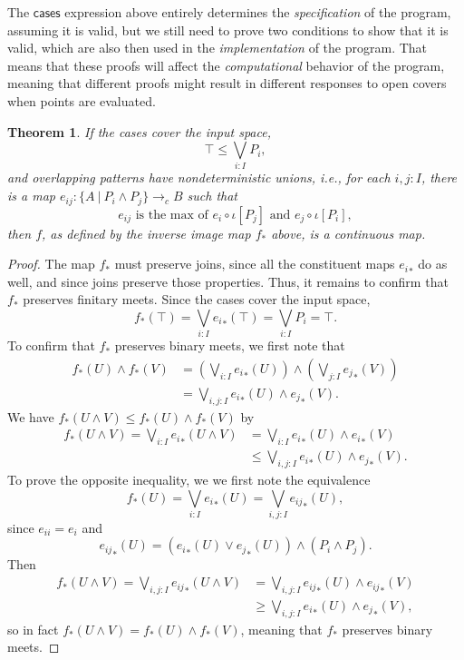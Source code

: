 \documentclass[conference]{IEEEtran}
\newtheorem{theorem}{Theorem}
\newcommand{\cto}{\to_c}
\newcommand{\suchthat}{\ |\ }
\newcommand{\oinclf}[1]{\iota[{#1}]}
\newcommand{\isthemaxof}[3]{{#1}\text{ is the max of }{#2}\text{ and }{#3}}
\begin{document}
The $\mathsf{cases}$ expression above entirely determines the \emph{specification} of the program, assuming it is valid, but we still need to prove two conditions to show that it is valid, which are also then used in the \emph{implementation} of the program. That means that these proofs will affect the \emph{computational} behavior of the program, meaning that different proofs might result in different responses to open covers when points are evaluated. 
\begin{theorem}
\label{pattern}
If the cases cover the input space,
\[
\top \le \bigvee_{i : I} P_i \tag{covering},
\]
and overlapping patterns have nondeterministic unions, i.e., for each $i, j : I$, there is a map $e_{ij} : \{A \suchthat P_i \wedge P_j \} \cto B$ such that
\[
\isthemaxof{ e_{ij} }{ e_i \circ \oinclf{P_j} }{ e_j \circ \oinclf{P_i} }, \tag{gluing}
\]
then $f$, as defined by the inverse image map $f_*$ above, is a continuous map.
\end{theorem}
\begin{proof}
The map $f_*$ must preserve joins, since all the constituent maps ${e_i}_*$ do as well, and since joins preserve those properties. Thus, it remains to confirm that $f_*$ preserves finitary meets.
Since the cases cover the input space,
\[
f_*(\top) = \bigvee_{i : I} {e_i}_*(\top) = \bigvee_{i : I}P_i = \top.
\]
To confirm that $f_*$ preserves binary meets, we first note that
\begin{align*}
f_*(U) \wedge f_*(V) 
  &= \left(\bigvee_{i : I} {e_i}_*(U) \right) \wedge \left( \bigvee_{j: I} {e_j}_*(V) \right)
\\ &= \bigvee_{i, j : I} {e_i}_*(U) \wedge {e_j}_*(V).
\end{align*}
We have $f_*(U \wedge V) \le f_*(U) \wedge f_*(V)$ by
\begin{align*}
f_*(U \wedge V)
  = \bigvee_{i : I} {e_i}_*(U \wedge V)
  &= \bigvee_{i : I} {e_i}_*(U) \wedge {e_i}_*(V)
  \\ &\le \bigvee_{i, j : I} {e_i}_*(U) \wedge {e_j}_*(V).
\end{align*}
To prove the opposite inequality, we we first note the equivalence
\[
f_*(U) = \bigvee_{i : I} {e_i}_*(U) = \bigvee_{i, j : I} {e_{ij}}_*(U),
\]
since $e_{ii} = e_i$ and 
\[
{e_{ij}}_*(U) = \left( {e_i}_*(U) \vee {e_j}_*(U) \right) \wedge \left(P_i \wedge P_j \right).
\]
Then
\begin{align*}
f_*(U \wedge V)
  = \bigvee_{i, j : I} {e_{ij}}_*(U \wedge V)
  &= \bigvee_{i, j : I} {e_{ij}}_*(U) \wedge {e_{ij}}_*(V)
  \\ &\ge \bigvee_{i, j : I} {e_i}_*(U) \wedge {e_j}_*(V),
\end{align*}
so in fact $f_*(U \wedge V) = f_*(U) \wedge f_*(V)$, meaning that $f_*$ preserves binary meets.
\end{proof}
\end{document}
